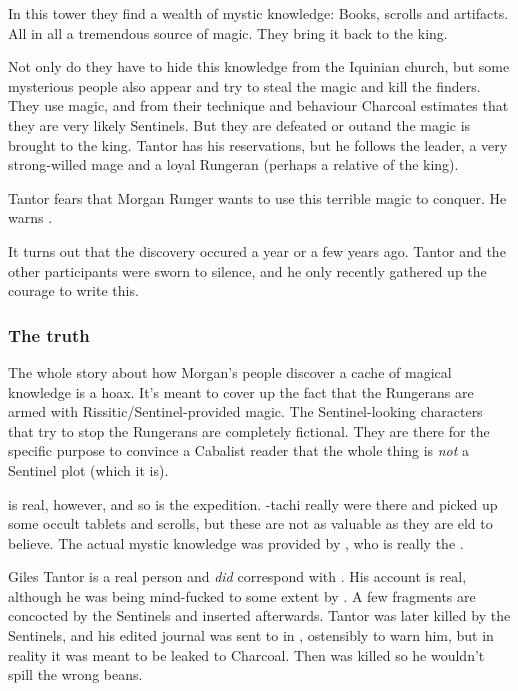 In this tower they find a wealth of mystic knowledge: Books, scrolls and artifacts. All in all a tremendous source of magic. They bring it back to the king. 

Not only do they have to hide this knowledge from the Iquinian church, but some mysterious people also appear and try to steal the magic and kill the finders. They use magic, and from their technique and behaviour Charcoal estimates that they are very likely Sentinels. But they are defeated or out\manoeuvred and the magic is brought to the king. Tantor has his reservations, but he follows the leader, a very strong-willed mage and a loyal Rungeran (perhaps a relative of the king). 

Tantor fears that Morgan Runger wants to use this terrible magic to conquer. He warns \Anatoli{}. 

It turns out that the discovery occured a year or a few years ago. Tantor and the other participants were sworn to silence, and he only recently gathered up the courage to write this. 






\subsubsection{The truth} 
The whole story about how Morgan's people discover a cache of magical knowledge is a hoax. It's meant to cover up the fact that the Rungerans are armed with Rissitic/Sentinel-provided magic. The Sentinel-looking characters that try to stop the Rungerans are completely fictional. They are there for the specific purpose to convince a Cabalist reader that the whole thing is \emph{not} a Sentinel plot (which it is). 

\Rungertemple{} is real, however, and so is the expedition. \Takestsha-tachi really were there and picked up some occult tablets and scrolls, but these are not as valuable as they are eld to believe. The actual mystic knowledge was provided by \Takestsha, who is really the \dragon{} \Nzessuacrith. 

Giles Tantor is a real person and \emph{did} correspond with \Anatoli{}. His account is real, although he was being mind-fucked to some extent by \Nzessuacrith. 
A few fragments are concocted by the Sentinels and inserted afterwards. Tantor was later killed by the Sentinels, and his edited journal was sent to \Anatoli{} in \Malcur, ostensibly to warn him, but in reality it was meant to be leaked to Charcoal. 
Then \Anatoli{} was killed so he wouldn't spill the wrong beans. 

